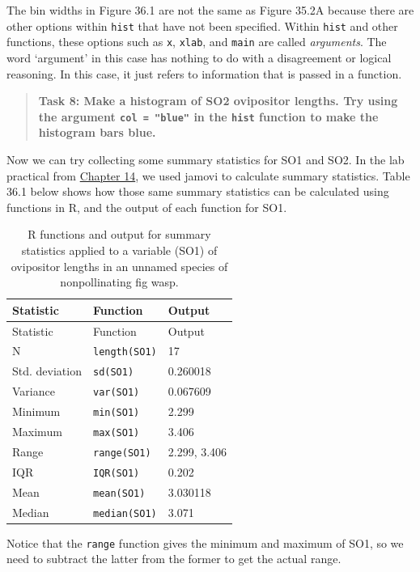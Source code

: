 \documentclass[
]{scrbook}
\begin{document}
The bin widths in Figure 36.1 are not the same as Figure 35.2A because there are other options within \texttt{hist} that have not been specified.
Within \texttt{hist} and other functions, these options such as \texttt{x}, \texttt{xlab}, and \texttt{main} are called \emph{arguments}.
The word `argument' in this case has nothing to do with a disagreement or logical reasoning.
In this case, it just refers to information that is passed in a function.

\begin{quote}
\textbf{Task 8: Make a histogram of SO2 ovipositor lengths. Try using the argument \texttt{col\ =\ "blue"} in the \texttt{hist} function to make the histogram bars blue.}
\end{quote}

Now we can try collecting some summary statistics for SO1 and SO2.
In the lab practical from \protect\hyperlink{Chapter_14}{Chapter 14}, we used jamovi to calculate summary statistics.
Table 36.1 below shows how those same summary statistics can be calculated using functions in R, and the output of each function for SO1.

\begin{longtable}[]{@{}lll@{}}
\caption{\label{tab:unnamed-chunk-212}R functions and output for summary statistics applied to a variable (SO1) of ovipositor lengths in an unnamed species of nonpollinating fig wasp.}\tabularnewline
\toprule
Statistic & Function & Output \\
\midrule
\endfirsthead
\toprule
Statistic & Function & Output \\
\midrule
\endhead
N & \texttt{length(SO1)} & 17 \\
Std. deviation & \texttt{sd(SO1)} & 0.260018 \\
Variance & \texttt{var(SO1)} & 0.067609 \\
Minimum & \texttt{min(SO1)} & 2.299 \\
Maximum & \texttt{max(SO1)} & 3.406 \\
Range & \texttt{range(SO1)} & 2.299, 3.406 \\
IQR & \texttt{IQR(SO1)} & 0.202 \\
Mean & \texttt{mean(SO1)} & 3.030118 \\
Median & \texttt{median(SO1)} & 3.071 \\
\bottomrule
\end{longtable}

Notice that the \texttt{range} function gives the minimum and maximum of SO1, so we need to subtract the latter from the former to get the actual range.
\end{document}
